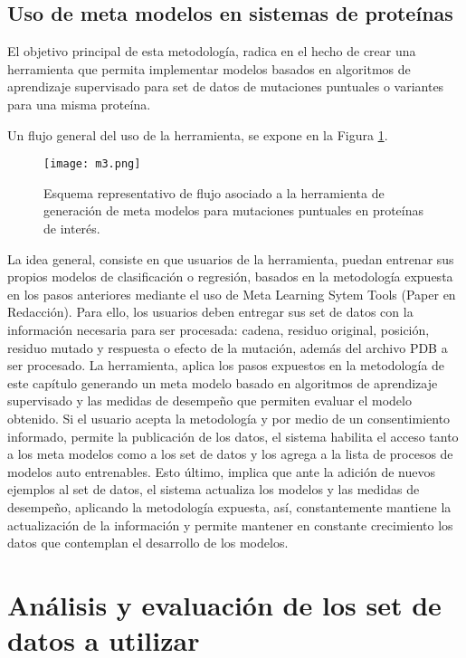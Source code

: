 \subsection{Uso de meta modelos en sistemas de proteínas}

El objetivo principal de esta metodología, radica en el hecho de crear una herramienta que permita implementar modelos basados en algoritmos de aprendizaje supervisado para set de datos de mutaciones puntuales o variantes para una misma proteína. 

Un flujo general del uso de la herramienta, se expone en la Figura \ref{C2:M3}.

\begin{figure}[!h]
	\centering
	\texttt{[image: m3.png]}
	\caption{Esquema representativo de flujo asociado a la herramienta de generación de meta modelos para mutaciones puntuales en proteínas de interés.}
	\label{C2:M3}
\end{figure}

La idea general, consiste en que usuarios de la herramienta, puedan entrenar sus propios modelos de clasificación o regresión, basados en la metodología expuesta en los pasos anteriores mediante el uso de Meta Learning Sytem Tools (Paper en Redacción). Para ello, los usuarios deben entregar sus set de datos con la información necesaria para ser procesada: cadena, residuo original, posición, residuo mutado y respuesta o efecto de la mutación, además del archivo PDB a ser procesado. La herramienta, aplica los pasos expuestos en la metodología de este capítulo generando un meta modelo basado en algoritmos de aprendizaje supervisado y las medidas de desempeño que permiten evaluar el modelo obtenido. Si el usuario acepta la metodología y por medio de un consentimiento informado, permite la publicación de los datos, el sistema habilita el acceso tanto a los meta modelos como a los set de datos y los agrega a la lista de procesos de modelos auto entrenables. Esto último, implica que ante la adición de nuevos ejemplos al set de datos, el sistema actualiza los modelos y las medidas de desempeño, aplicando la metodología expuesta, así, constantemente mantiene la actualización de la información y permite mantener en constante crecimiento los datos que contemplan el desarrollo de los modelos.

\section{Análisis y evaluación de los set de datos a utilizar}

